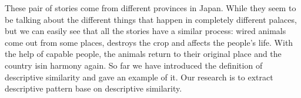 These pair of stories come from different provinces in Japan. While they seem to be talking about the different things that happen in completely different palaces, but we can easily see that all the stories have a similar process: wired animals come out from some places, destroys the crop and affects the people's life. With the help of capable people, the animals return to their original place and the country isin harmony again.
So far we have introduced the definition of descriptive similarity and gave an example of it. Our research is to extract descriptive pattern base on descriptive similarity.